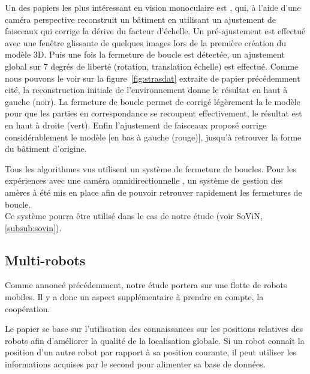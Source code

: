 Un des papiers les plus intéressant en vision monoculaire est \cite{Strasdat10}, qui, à l'aide d'une caméra perspective reconstruit un bâtiment en utilisant un ajustement de faisceaux qui corrige la dérive du facteur d'échelle.
Un pré-ajustement est effectué avec une fenêtre glissante de quelques images lors de la première création du modèle 3D.
Puis une fois la fermeture de boucle est détectée, un ajustement global sur 7 degrés de liberté (rotation, translation échelle) est effectué.
Comme nous pouvons le voir sur la figure~\ref{fig:strasdat} extraite de papier précédemment cité, la reconstruction initiale de l'environnement donne le résultat en haut à gauche (noir).
La fermeture de boucle permet de corrigé légèrement la le modèle pour que les parties en correspondance se recoupent effectivement, le résultat est en haut à droite (vert).
Enfin l'ajustement de faisceaux proposé corrige considérablement le modèle [en bas à gauche (rouge)], jusqu'à retrouver la forme du bâtiment d'origine.

Tous les algorithmes vus utilisent un système de fermeture de boucles. 
Pour les expériences avec une caméra omnidirectionnelle \cite{Korrapati11}, un système de gestion des amères à été mis en place afin de pouvoir retrouver rapidement les fermetures de boucle.\\
Ce système pourra être utilisé dans le cas de notre étude (voir SoViN, \ref{subsub:sovin}).



\subsection{Multi-robots}

Comme annoncé précédemment, notre étude portera sur une flotte de robots mobiles.
Il y a donc un aspect supplémentaire à prendre en compte, la coopération.

Le papier \cite{Hukui10} se base sur l'utilisation des connaissances sur les positions relatives des robots afin d'améliorer la qualité de la localisation globale.
Si un robot connaît la position d'un autre robot par rapport à sa position courante, il peut utiliser les informations acquises par le second pour alimenter sa base de données.

